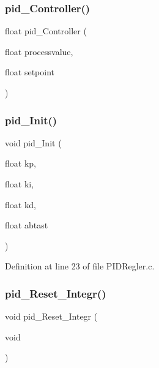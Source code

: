\subsubsection{pid\+\_\+\+Controller()}
{\footnotesize\ttfamily float pid\+\_\+\+Controller (\begin{DoxyParamCaption}\item[{float}]{processvalue,  }\item[{float}]{setpoint }\end{DoxyParamCaption})}

\mbox{\label{_p_i_d_regler_8h_a6eb065a52b581d2104b4c7cefb169469}} 
\subsubsection{pid\+\_\+\+Init()}
{\footnotesize\ttfamily void pid\+\_\+\+Init (\begin{DoxyParamCaption}\item[{float}]{kp,  }\item[{float}]{ki,  }\item[{float}]{kd,  }\item[{float}]{abtast }\end{DoxyParamCaption})}



Definition at line 23 of file P\+I\+D\+Regler.\+c.

\mbox{\label{_p_i_d_regler_8h_a357ebf44d57805c223cefeaba4889c3a}} 
\subsubsection{pid\+\_\+\+Reset\+\_\+\+Integr()}
{\footnotesize\ttfamily void pid\+\_\+\+Reset\+\_\+\+Integr (\begin{DoxyParamCaption}\item[{void}]{ }\end{DoxyParamCaption})}

